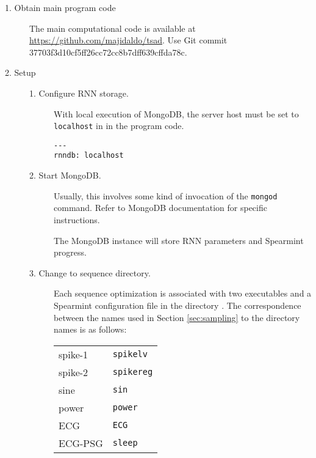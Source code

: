 \begin{description}
\item[1. Obtain main program code] \hfill

  The main computational code is available at \url{https://github.com/majidaldo/tsad}.
  Use \textsf{Git} commit 37703f3d10cf5ff26cc72cc8b7dff639cffda78c.
  


\item[2. Setup] \hfill

  \begin{description}

  \item[1. Configure RNN storage.] \hfill

    With local execution of \textsf{MongoDB}, the server host must be set to \texttt{localhost} in  in the program code.

\begin{verbatim}
---
rnndb: localhost
\end{verbatim}


  \item[2. Start \textsf{MongoDB}.] \hfill
    
    Usually, this involves some kind of invocation of the \texttt{mongod} command.
    Refer to \textsf{MongoDB} documentation for specific instructions.

    The \textsf{MongoDB} instance will store RNN parameters and \textsf{Spearmint} progress.


  \item[3. Change to sequence directory.] \hfill

    Each sequence optimization is associated with two executables and a \textsf{Spearmint} configuration file in the directory .
    The correspondence between the names used in Section \ref{sec:sampling} to the directory names is as follows:
    
    \begin{tabular}{ll}
      spike-1 & \texttt{spikelv} \\
      spike-2 & \texttt{spikereg} \\
      sine    & \texttt{sin} \\
      power   & \texttt{power} \\
      ECG     & \texttt{ECG} \\
      ECG-PSG & \texttt{sleep} \\
    \end{tabular}



\end{description}
\end{description}
